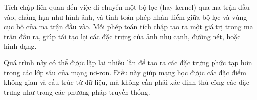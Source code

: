 \documentclass{article}
\newcommand{\K}[2]{%
	\edef\Kcol##1##2##3{###2}%
	\edef\Krow##1##2##3{\noexpand\Kcol###1}%
	\Krow
	{1 0 1}
	{0 1 0}
	{1 0 1}%
}
\begin{document}
Tích chập liên quan đến việc di chuyển một bộ lọc (hay kernel) qua ma trận đầu vào, chẳng hạn như hình ảnh, và tính toán phép nhân điểm giữa bộ lọc và vùng cục bộ của ma trận đầu vào. Mỗi phép toán tích chập tạo ra một giá trị trong ma trận đầu ra, giúp tái tạo lại các đặc trưng của ảnh như cạnh, đường nét, hoặc hình dạng.\medskip

Quá trình này có thể được lặp lại nhiều lần để tạo ra các đặc trưng phức tạp hơn trong các lớp sâu của mạng nơ-ron. Điều này giúp mạng học được các đặc điểm không gian và cấu trúc từ dữ liệu, mà không cần phải xác định thủ công các đặc trưng như trong các phương pháp truyền thống.\medskip

\begin{center}
\end{center}
\end{document}
